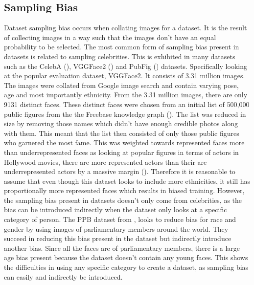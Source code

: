 \documentclass{l4proj}
\begin{document}
\subsection{Sampling Bias}
Dataset sampling bias occurs when collating images for a dataset. It is the result of collecting images in a way such that the images don't have an equal probability to be selected. The most common form of sampling bias present in datasets is related to sampling celebrities. This is exhibited in many datasets such as the CelebA (\cite{celeba}), VGGFace2 (\cite{vggface2}) and PubFig (\cite{pubfig}) datasets. Specifically looking at the popular evaluation dataset, VGGFace2. It consists of 3.31 million images. The images were collated from Google image search and contain varying pose, age and most importantly ethnicity. From the 3.31 million images, there are only 9131 distinct faces. These distinct faces were chosen from an initial list of 500,000 public figures from the the Freebase knowledge graph (\cite{freebase}). The list was reduced in size by removing those names which didn't have enough credible photos along with them. This meant that the list then consisted of only those public figures who garnered the most fame. This was weighted towards represented faces more than underrepresented faces as looking at popular figures in terms of actors in Hollywood movies, there are more represented actors than their are underrepresented actors by a massive margin (\cite{hollywoo}). Therefore it is reasonable to assume that even though this dataset looks to include more ethnicities, it still has proportionally more represented faces which results in biased training. However, the sampling bias present in datasets doesn't only come from celebrities, as the bias can be introduced indirectly when the dataset only looks at a specific category of person. The PPB dataset from \cite{gendershades}, looks to reduce bias for race and gender by using images of parliamentary members around the world. They succeed in reducing this bias present in the dataset but indirectly introduce another bias. Since all the faces are of parliamentary members, there is a large age bias present because the dataset doesn't contain any young faces. This shows the difficulties in using any specific category to  create a dataset, as sampling bias can easily and indirectly be introduced. 
\end{document}
